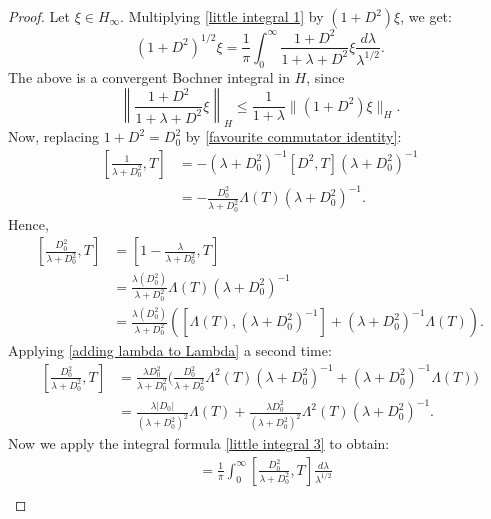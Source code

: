 \begin{proof}
        Let $\xi \in H_\infty$. Multiplying \eqref{little integral 1} by $(1+D^2)\xi$, we get:
        \begin{equation}\label{little integral 3}
            (1+D^2)^{1/2}\xi = \frac{1}{\pi}\int_0^\infty \frac{1+D^2}{1+\lambda+D^2}\xi\frac{d\lambda}{\lambda^{1/2}}.
        \end{equation}
        The above is a convergent Bochner integral in $H$, since
        \begin{equation*}
            \left\|\frac{1+D^2}{1+\lambda+D^2}\xi\right\|_H \leq \frac{1}{1+\lambda}\|(1+D^2)\xi\|_H.
        \end{equation*}
        Now, replacing $1+D^2 = D_0^2$ by \eqref{favourite commutator identity}:
        \begin{align}\label{adding lambda to Lambda}
            \left[\frac{1}{\lambda+D_0^2},T\right] &= -(\lambda+D_0^2)^{-1}[D^2,T](\lambda+D_0^2)^{-1}\nonumber\\
                                                   &= -\frac{D_0^2}{\lambda+D_0^2}\Lambda(T)(\lambda+D_0^2)^{-1}.
        \end{align}
        Hence,
        \begin{align*}
            \left[\frac{D_0^2}{\lambda+D_0^2},T\right] &= \left[1-\frac{\lambda}{\lambda+D_0^2},T\right]\\
                                                       &= \frac{\lambda(D_0^2)}{\lambda+D_0^2}\Lambda(T)(\lambda+D_0^2)^{-1}\\
                                                       &= \frac{\lambda(D_0^2)}{\lambda+D_0^2}([\Lambda(T),(\lambda+D_0^2)^{-1}]+(\lambda+D_0^2)^{-1}\Lambda(T)).
        \end{align*}
        Applying \eqref{adding lambda to Lambda} a second time:
        \begin{align*}
            \left[\frac{D_0^2}{\lambda+D_0^2},T\right] &= \frac{\lambda D_0^2}{\lambda+D_0^2}\Big(\frac{D_0^2}{\lambda+D_0^2}\Lambda^2(T)(\lambda+D_0^2)^{-1} +(\lambda+D_0^2)^{-1}\Lambda(T)\Big)\\
                                                       &= \frac{\lambda|D_0|}{(\lambda+D_0^2)^2}\Lambda(T)+ \frac{\lambda D_0^2}{(\lambda+D_0^2)^2}\Lambda^2(T)(\lambda+D_0^2)^{-1}.
        \end{align*}
        Now we apply the integral formula \eqref{little integral 3} to obtain:
        \begin{align*}
            [|D_0|,T]         &= \frac{1}{\pi}\int_0^\infty \left[\frac{D_0^2}{\lambda+D_0^2},T\right]\frac{d\lambda}{\lambda^{1/2}}\\

\end{align*}
\end{proof}
